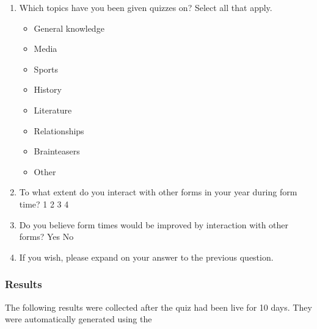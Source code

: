 {{\begin{enumerate}[leftmargin=0cm,itemindent=.5cm,labelwidth=\itemindent,labelsep=0cm,align=left]
					\item Which topics have you been given quizzes on? Select all that apply.
								\begin{itemize}
									\item General knowledge
									\item Media
									\item Sports
									\item History
									\item Literature
									\item Relationships
									\item Brainteasers
									\item Other\\
								\end{itemize}
					\item To what extent do you interact with other forms in your year during form time? 1 2 3 4\\
					\item Do you believe form times would be improved by interaction with other forms? Yes No\\
					\item If you wish, please expand on your answer to the previous question.
				\end{enumerate}
    }%
}

\subsubsection{Results}
The following results were collected after the quiz had been live for 10 days. They were automatically generated using the 